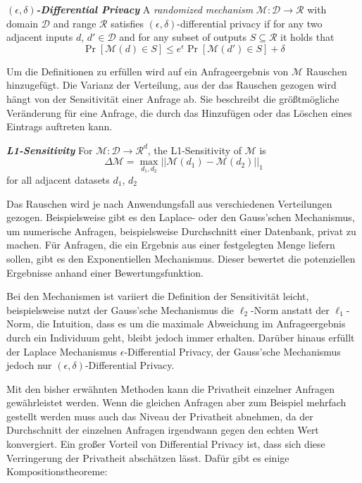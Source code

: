 \begin{definition}
	\emph{\textbf{$(\epsilon, \delta)$-Differential Privacy}} A \textit{randomized mechanism} $\mathcal{M}: \mathcal{D} \rightarrow \mathcal{R}$ with domain $\mathcal{D}$ and range $\mathcal{R}$ satisfies $(\epsilon, \delta)$-differential privacy if for any two adjacent inputs $d$, $d' \in \mathcal{D}$ and for any subset of outputs $S \subseteq \mathcal{R}$ it holds that $$\Pr[\mathcal{M}(d) \in S] \leq e^{\epsilon} \Pr[\mathcal{M}(d') \in S] + \delta$$
\end{definition}

Um die Definitionen zu erfüllen wird auf ein Anfrageergebnis von $\mathcal{M}$ Rauschen hinzugefügt. Die Varianz der Verteilung, aus der das Rauschen gezogen wird hängt von der Sensitivität einer Anfrage ab. Sie beschreibt die größtmögliche Veränderung für eine Anfrage, die durch das Hinzufügen oder das Löschen eines Eintrags auftreten kann.\cite{dwork:2006}

\begin{definition}
	\emph{\textbf{L1-Sensitivity}} For $\mathcal{M}: \mathcal{D} \rightarrow \mathcal{R}^{d}$, the L1-Sensitivity of $\mathcal{M}$ is 
	$$
	\Delta \mathcal{M} = \max_{d_1, d_2}{||\mathcal{M}(d_1) - \mathcal{M}(d_2)||}_1
	$$
	for all adjacent datasets $d_1$, $d_2$
\end{definition}

Das Rauschen wird je nach Anwendungsfall aus verschiedenen Verteilungen gezogen. Beispielsweise gibt es den Laplace- oder den Gauss'schen Mechanismus, um numerische Anfragen, beispielsweise Durchschnitt einer Datenbank, privat zu machen. Für Anfragen, die ein Ergebnis aus einer festgelegten Menge liefern sollen, gibt es den Exponentiellen Mechanismus. Dieser bewertet die potenziellen Ergebnisse anhand einer Bewertungsfunktion.\cite{mcsherry:2007}

Bei den Mechanismen ist variiert die Definition der Sensitivität leicht, beispielsweise nutzt der Gauss'sche Mechanismus die $\ell_2$-Norm anstatt der $\ell_1$-Norm, die Intuition, dass es um die maximale Abweichung im Anfrageergebnis durch ein Individuum geht, bleibt jedoch immer erhalten. Darüber hinaus erfüllt der Laplace Mechanismus $\epsilon$-Differential Privacy, der Gauss'sche Mechanismus jedoch nur $(\epsilon, \delta)$-Differential Privacy.\cite[p.261ff]{dwork:2014}

Mit den bisher erwähnten Methoden kann die Privatheit einzelner Anfragen gewährleistet werden. Wenn die gleichen Anfragen aber zum Beispiel mehrfach gestellt werden muss auch das Niveau der Privatheit abnehmen, da der Durchschnitt der einzelnen Anfragen irgendwann gegen den echten Wert konvergiert.\cite[p.42]{dwork:2014} Ein großer Vorteil von Differential Privacy ist, dass sich diese Verringerung der Privatheit abschätzen lässt. Dafür gibt es einige Kompositionstheoreme:

